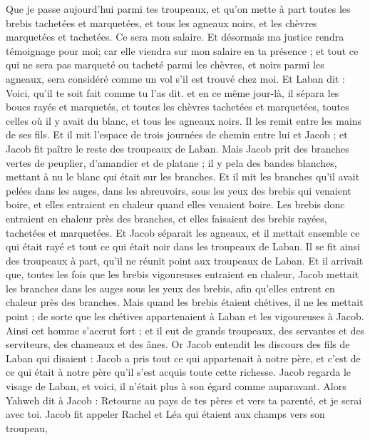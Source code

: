 \begin{multicols}{2}
Que je passe aujourd'hui parmi tes troupeaux, et qu'on mette à part toutes les brebis tachetées et marquetées, et tous les agneaux noirs, et les chèvres marquetées et tachetées. Ce sera mon salaire.
Et désormais ma justice rendra témoignage pour moi; car elle viendra sur mon salaire en ta présence ; et tout ce qui ne sera pas marqueté ou tacheté parmi les chèvres, et noirs parmi les agneaux, sera considéré comme un vol s'il est trouvé chez moi.
Et Laban dit : Voici, qu'il te soit fait comme tu l'as dit.
et en ce même jour-là, il sépara les boucs rayés et marquetés, et toutes les chèvres tachetées et marquetées, toutes celles où il y avait du blanc, et tous les agneaux noirs. Il les remit entre les mains de ses fils.
Et il mit l'espace de trois journées de chemin entre lui et Jacob ; et Jacob fit paître le reste des troupeaux de Laban.
Mais Jacob prit des branches vertes de peuplier, d'amandier et de platane ; il y pela des bandes blanches, mettant à nu le blanc qui était sur les branches.
Et il mit les branches qu'il avait pelées dans les auges, dans les abreuvoirs, sous les yeux des brebis qui venaient boire, et elles entraient en chaleur quand elles venaient boire.
Les brebis donc entraient en chaleur près des branches, et elles faisaient des brebis rayées, tachetées et marquetées.
Et Jacob séparait les agneaux, et il mettait ensemble ce qui était rayé et tout ce qui était noir dans les troupeaux de Laban. Il se fit ainsi des troupeaux à part, qu'il ne réunit point aux troupeaux de Laban.
Et il arrivait que, toutes les fois que les brebis vigoureuses entraient en chaleur, Jacob mettait les branches dans les auges sous les yeux des brebis, afin qu'elles entrent en chaleur près des branches.
Mais quand les brebis étaient chétives, il ne les mettait point ; de sorte que les chétives appartenaient à Laban et les vigoureuses à Jacob.
Ainsi cet homme s'accrut fort ; et il eut de grands troupeaux, des servantes et des serviteurs, des chameaux et des ânes.
\VerseOne{}Or Jacob entendit les discours des fils de Laban qui disaient : Jacob a pris tout ce qui appartenait à notre père, et c'est de ce qui était à notre père qu'il s'est acquis toute cette richesse.
Jacob regarda le visage de Laban, et voici, il n'était plus à son égard comme auparavant.
Alors Yahweh dit à Jacob : Retourne au pays de tes pères et vers ta parenté, et je serai avec toi.
Jacob fit appeler Rachel et Léa qui étaient aux champs vers son troupeau,

\end{multicols}
